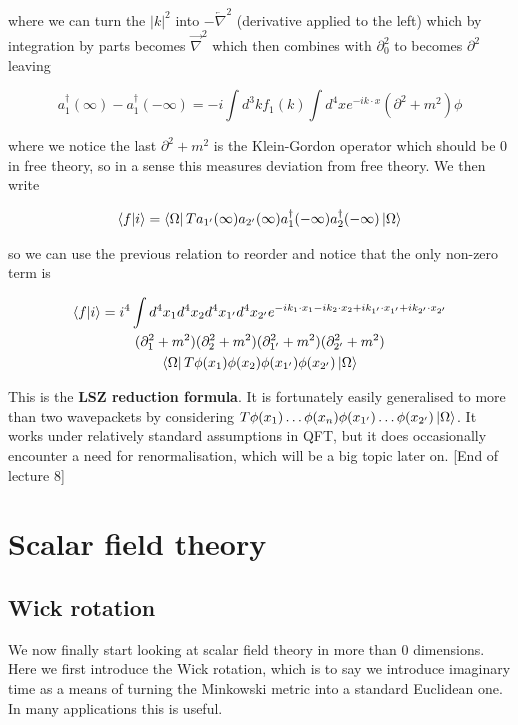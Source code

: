 \documentclass{article}
\theoremstyle{definition}
\begin{document}
where we can turn the $|k|^2$ into $-\overleftarrow{\nabla}^2$ (derivative
applied to the left) which by integration by parts becomes $\vec{\nabla}^2$
which then combines with $\partial_0^2$ to becomes $\partial^2$ leaving

\begin{equation}
  a_1^\dagger(\infty) - a_1^\dagger(-\infty) = -i \int d^3k f_1(k)
  \int d^4x e^{-ik \cdot x} (\partial^2 + m^2) \phi
\end{equation}

where we notice the last $\partial^2 + m^2$ is the Klein-Gordon operator which
should be 0 in free theory, so in a sense this measures deviation from free
theory. We then write

\begin{equation}
  \bra{f} \ket{i} = \bra{\Omega} T a_{1'} (\infty) a_{2'}(\infty)
  a_1^\dagger(-\infty) a_2^\dagger(-\infty) \ket{\Omega}
\end{equation}

so we can use the previous relation to reorder and notice that the only non-zero
term is

\begin{multline}
  \bra{f} \ket{i} = i^4 \int d^4x_1 d^4x_2 d^4x_{1'} d^4x_{2'}
  e^{-ik_1 \cdot x_1 - ik_2 \cdot x_2 + ik_{1'} \cdot x_{1'} + ik_{2'} \cdot
    x_{2'}} \\
  (\partial_1^2 + m^2) (\partial_2^2 + m^2) (\partial_{1'}^2 + m^2)
  (\partial_{2'}^2 + m^2) \\
  \bra{\Omega} T\phi(x_1) \phi(x_2) \phi(x_{1'}) \phi(x_{2'}) \ket{\Omega}
\end{multline}

This is the \textbf{LSZ reduction formula}. It is fortunately easily generalised
to more than two wavepackets by considering $T \phi(x_1) \dots \phi(x_n)
\phi(x_{1'}) \dots \phi(x_{2'}) \ket{\Omega}$. It works under relatively
standard assumptions in QFT, but it does occasionally encounter a need for
renormalisation, which will be a big topic later on. [End of lecture 8]

\section{Scalar field theory}

\subsection{Wick rotation}

We now finally start looking at scalar field theory in more than 0 dimensions.
Here we first introduce the Wick rotation, which is to say we introduce
imaginary time as a means of turning the Minkowski metric into a standard
Euclidean one. In many applications this is useful.
\end{document}
